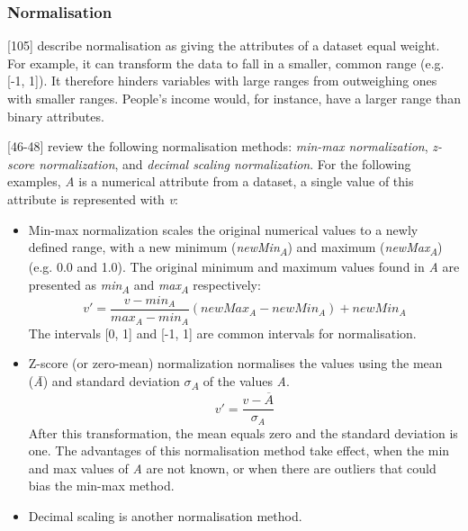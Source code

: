 \subsubsection{Normalisation}
\label{section:Normalisation}

\textcite{han2011data}[105] describe normalisation as giving the attributes of a dataset equal weight. For example, it can transform the data to fall in a smaller, common range (e.g. [-1, 1]). It therefore hinders variables with large ranges from outweighing ones with smaller ranges. People's income would, for instance, have a larger range than binary attributes. 

\textcite{dataPreprocessingInDataMining}[46-48] review the following normalisation methods: \textit{min-max normalization}, \textit{z-score normalization}, and \textit{decimal scaling normalization}. For the following examples, \textit{A} is a numerical attribute from a dataset, a single value of this attribute is represented with \textit{v}:
\begin{itemize}
  \item Min-max normalization scales the original numerical values to a newly defined range, with a new minimum (\textit{newMin\textsubscript{A}}) and maximum (\textit{newMax\textsubscript{A}}) (e.g. 0.0 and 1.0). The original minimum and maximum values found in \textit{A} are presented as \textit{min\textsubscript{A}} and \textit{max\textsubscript{A}} respectively:
  \[
    v' = \frac{v - min_A}{max_A - min_A}(newMax_A - newMin_A) + newMin_A
  \]
  The intervals [0, 1] and [-1, 1] are common intervals for normalisation. 

  \item Z-score (or zero-mean) normalization normalises the values using the mean (\textit{\={A}}) and standard deviation \textit{$\sigma$\textsubscript{A}} of the values \textit{A}.
  \[
    v' = \frac{v - \overline{A}}{\sigma_A}
  \]
  After this transformation, the mean equals zero and the standard deviation is one. The advantages of this normalisation method take effect, when the min and max values of \textit{A} are not known, or when there are outliers that could bias the min-max method.

  \item Decimal scaling is another normalisation method.
 
\end{itemize}
